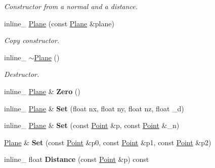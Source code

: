 \begin{DoxyCompactItemize}
\begin{DoxyCompactList}\small\item\em Constructor from a normal and a distance. \end{DoxyCompactList}\item 
inline\+\_\+ \hyperlink{classPlane_a58f64da1c7e9b12d93e6a4e75d3be901}{Plane} (const \hyperlink{classPlane}{Plane} \&plane)\hypertarget{classPlane_a58f64da1c7e9b12d93e6a4e75d3be901}{}\label{classPlane_a58f64da1c7e9b12d93e6a4e75d3be901}

\begin{DoxyCompactList}\small\item\em Copy constructor. \end{DoxyCompactList}\item 
inline\+\_\+ \hyperlink{classPlane_a380cb359aa32967b8e678b9f0610ec88}{$\sim$\+Plane} ()\hypertarget{classPlane_a380cb359aa32967b8e678b9f0610ec88}{}\label{classPlane_a380cb359aa32967b8e678b9f0610ec88}

\begin{DoxyCompactList}\small\item\em Destructor. \end{DoxyCompactList}\item 
inline\+\_\+ \hyperlink{classPlane}{Plane} \& {\bfseries Zero} ()\hypertarget{classPlane_aed029c8093a95e0f9e982bc7759b4ba6}{}\label{classPlane_aed029c8093a95e0f9e982bc7759b4ba6}

\item 
inline\+\_\+ \hyperlink{classPlane}{Plane} \& {\bfseries Set} (float nx, float ny, float nz, float \+\_\+d)\hypertarget{classPlane_ae96be08f62e6814f2c48791e6ad3cf30}{}\label{classPlane_ae96be08f62e6814f2c48791e6ad3cf30}

\item 
inline\+\_\+ \hyperlink{classPlane}{Plane} \& {\bfseries Set} (const \hyperlink{classPoint}{Point} \&p, const \hyperlink{classPoint}{Point} \&\+\_\+n)\hypertarget{classPlane_a075dc73d74d819f323bcc14bab370204}{}\label{classPlane_a075dc73d74d819f323bcc14bab370204}

\item 
\hyperlink{classPlane}{Plane} \& {\bfseries Set} (const \hyperlink{classPoint}{Point} \&p0, const \hyperlink{classPoint}{Point} \&p1, const \hyperlink{classPoint}{Point} \&p2)\hypertarget{classPlane_ae03ca3929e0a8fe1b756878c75729dde}{}\label{classPlane_ae03ca3929e0a8fe1b756878c75729dde}

\item 
inline\+\_\+ float {\bfseries Distance} (const \hyperlink{classPoint}{Point} \&p) const \hypertarget{classPlane_a8c9d643fb2860cd29c98473f429d0e02}{}\label{classPlane_a8c9d643fb2860cd29c98473f429d0e02}


\end{DoxyCompactItemize}
